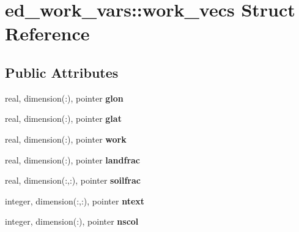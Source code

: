 \hypertarget{structed__work__vars_1_1work__vecs}{
\section{ed\_\-work\_\-vars::work\_\-vecs Struct Reference}
\label{structed__work__vars_1_1work__vecs}
}
\subsection*{Public Attributes}
\begin{DoxyCompactItemize}
\item 
\hypertarget{structed__work__vars_1_1work__vecs_a56017f9175b2ceb5431fcf8f30431e0d}{
real, dimension(:), pointer {\bfseries glon}}
\label{structed__work__vars_1_1work__vecs_a56017f9175b2ceb5431fcf8f30431e0d}

\item 
\hypertarget{structed__work__vars_1_1work__vecs_a15801795fa593746057fcfc20680e5dc}{
real, dimension(:), pointer {\bfseries glat}}
\label{structed__work__vars_1_1work__vecs_a15801795fa593746057fcfc20680e5dc}

\item 
\hypertarget{structed__work__vars_1_1work__vecs_a237f3b5def9a953ea2f4c98d9b44242f}{
real, dimension(:), pointer {\bfseries work}}
\label{structed__work__vars_1_1work__vecs_a237f3b5def9a953ea2f4c98d9b44242f}

\item 
\hypertarget{structed__work__vars_1_1work__vecs_a95bf10ed58ab91db823bc91afc2dd947}{
real, dimension(:), pointer {\bfseries landfrac}}
\label{structed__work__vars_1_1work__vecs_a95bf10ed58ab91db823bc91afc2dd947}

\item 
\hypertarget{structed__work__vars_1_1work__vecs_a986f649ac6884fb7dc6745ff97126058}{
real, dimension(:,:), pointer {\bfseries soilfrac}}
\label{structed__work__vars_1_1work__vecs_a986f649ac6884fb7dc6745ff97126058}

\item 
\hypertarget{structed__work__vars_1_1work__vecs_a9176c879d3ef987289159effa0c319c8}{
integer, dimension(:,:), pointer {\bfseries ntext}}
\label{structed__work__vars_1_1work__vecs_a9176c879d3ef987289159effa0c319c8}

\item 
\hypertarget{structed__work__vars_1_1work__vecs_a022d27e49efc70211f3d75943776ba51}{
integer, dimension(:), pointer {\bfseries nscol}}
\label{structed__work__vars_1_1work__vecs_a022d27e49efc70211f3d75943776ba51}


\end{DoxyCompactItemize}
